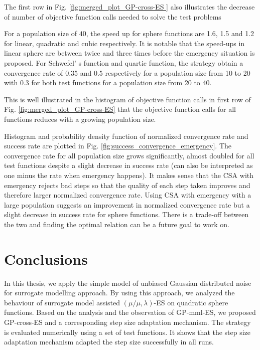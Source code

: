 The first row in Fig. \ref{fig:merged_plot_GP-cross-ES } also illustrates the decrease of number of objective function calls needed to solve the test problems 

For a population size of $40$, the speed up for sphere functions are 1.6, 1.5 and 1.2 for linear, quadratic and cubic respectively. It is notable that the speed-ups in linear sphere are between twice and three times before the emergency situation is proposed. For Schwefel' s function and quartic function, the strategy obtain a convergence rate of 0.35 and 0.5 respectively for a population size from 10 to 20 with 0.3 for both test functions for a population size from 20 to 40. 

This is well illustrated in the histogram of objective function calls in first row of Fig. \ref{fig:merged_plot_GP-cross-ES} that the objective function calls for all functions reduces with a growing population size. 

Histogram and probability density function of normalized convergence rate and success rate are plotted in Fig. \ref{fig:success_convergence_emergency}. The convergence rate for all population size grows significantly, almost doubled for all test functions despite a slight decrease in success rate (can also be interpreted as one minus the rate when emergency happens). It makes sense that the CSA with emergency rejects bad steps so that the quality of each step taken improves and therefore larger normalized convergence rate. Using CSA with emergency with a large population suggests an improvement in normalized convergence rate but a slight decrease in success rate for sphere functions. There is a trade-off between the two and finding the optimal relation can be a future goal to work on.










\section{Conclusions}
In this thesis, we apply the simple model \cite{DBLP:conf/ppsn/KayhaniA18} of unbiased Gaussian distributed noise for surrogate modelling  approach. By using this approach, we analyzed the behaviour of surrogate model assisted $(\mu/\mu,\lambda)$-ES on quadratic sphere functions. Based on the analysis and the observation of GP-mml-ES, we proposed GP-cross-ES and a corresponding step size adaptation mechanism. The strategy is evaluated numerically using a set of test functions. It shows that the step size adaptation mechanism adapted the step size successfully in all runs.

